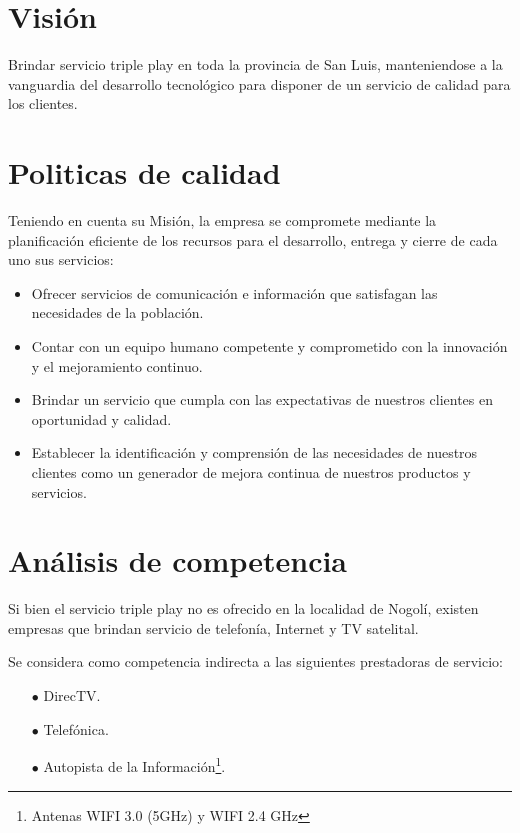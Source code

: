 \documentclass[12pt,a4paper]{book}
\begin{document}
\section{Visión}
Brindar servicio triple play en toda la provincia de San Luis, manteniendose a la vanguardia del desarrollo tecnológico para disponer de un servicio de calidad para los clientes.

\section{Politicas de calidad}
Teniendo en cuenta su Misión, la empresa se compromete mediante la planificación eficiente de los recursos para el desarrollo, entrega y cierre de cada uno sus servicios:

\begin{itemize}
\item Ofrecer servicios de comunicación e información que satisfagan las necesidades de la población.
\item Contar con un equipo humano competente y comprometido con la innovación y el mejoramiento continuo.
\item Brindar un servicio que cumpla con las expectativas de nuestros clientes en oportunidad y calidad.
\item Establecer la identificación y comprensión de las necesidades de nuestros clientes como un generador de mejora continua de nuestros productos y servicios.
\end{itemize}

\section{Análisis de competencia}\label{sec_analisis_competencia_Pnegocio}

\medskip 

Si bien el servicio triple play no es ofrecido en la localidad de Nogolí, existen empresas que brindan servicio de telefonía, Internet y TV satelital.

\medskip 

Se considera como competencia indirecta a las siguientes prestadoras de servicio:
\begin{itemize}
\item[$\bullet$] DirecTV.
\item[$\bullet$] Telefónica.
\item[$\bullet$] Autopista de la Información\footnote{Antenas WIFI 3.0 (5GHz) y WIFI 2.4 GHz}.
\end{itemize}
\end{document}
